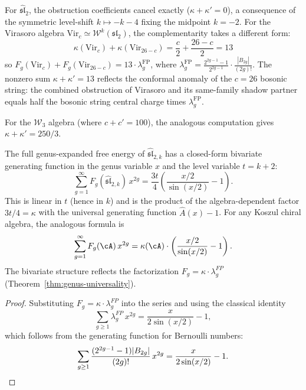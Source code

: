 \begin{remark}\label{rem:sl2-vs-vir-complementarity}
For $\widehat{\mathfrak{sl}}_2$, the obstruction coefficients cancel exactly ($\kappa + \kappa' = 0$), a consequence of the symmetric level-shift $k \mapsto -k-4$ fixing the midpoint $k = -2$.  For the Virasoro algebra $\mathrm{Vir}_c \simeq \mathcal{W}^k(\mathfrak{sl}_2)$, the complementarity takes a different form:
\[
\kappa(\mathrm{Vir}_c) + \kappa(\mathrm{Vir}_{26-c}) = \frac{c}{2} + \frac{26-c}{2} = 13
\]
so $F_g(\mathrm{Vir}_c) + F_g(\mathrm{Vir}_{26-c}) = 13 \cdot \lambda_g^{\mathrm{FP}}$, where $\lambda_g^{\mathrm{FP}} = \frac{2^{2g-1}-1}{2^{2g-1}} \cdot \frac{|B_{2g}|}{(2g)!}$.  The nonzero sum $\kappa + \kappa' = 13$ reflects the conformal anomaly of the $c = 26$ bosonic string: the combined obstruction of Virasoro and its same-family shadow partner equals half the bosonic string central charge times $\lambda_g^{\mathrm{FP}}$.

For the $\mathcal{W}_3$ algebra (where $c + c' = 100$), the analogous computation gives $\kappa + \kappa' = 250/3$.
\end{remark}

\begin{proposition}
\label{prop:bivariate-gf}
The full genus-expanded free energy of $\widehat{\mathfrak{sl}}_{2,k}$ has a closed-form bivariate generating function in the genus variable $x$ and the level variable $t = k + 2$:
\begin{equation}\label{eq:bivariate-gf}
\sum_{g=1}^{\infty} F_g(\widehat{\mathfrak{sl}}_{2,k})\, x^{2g} = \frac{3t}{4}\left(\frac{x/2}{\sin(x/2)} - 1\right).
\end{equation}
This is linear in $t$ (hence in $k$) and is the product of the algebra-dependent factor $3t/4 = \kappa$ with the universal generating function $\hat{A}(x) - 1$.  For any Koszul chiral algebra, the analogous formula is
\begin{equation}\label{eq:bivariate-gf-general}
\sum_{g=1}^{\infty} F_g(\cA)\, x^{2g} = \kappa(\cA) \cdot \left(\frac{x/2}{\sin(x/2)} - 1\right).
\end{equation}
The bivariate structure reflects the factorization $F_g = \kappa \cdot \lambda_g^{FP}$ (Theorem~\ref{thm:genus-universality}).
\end{proposition}

\begin{proof}
Substituting $F_g = \kappa \cdot \lambda_g^{FP}$ into the series and using the classical identity
\[
\sum_{g \geq 1} \lambda_g^{FP}\, x^{2g} = \frac{x}{2\sin(x/2)} - 1,
\]
which follows from the generating function for Bernoulli numbers:
\[
\sum_{g \geq 1} \frac{(2^{2g-1}-1)|B_{2g}|}{(2g)!}\, x^{2g} = \frac{x}{2\sin(x/2)} - 1. \qedhere
\]
\end{proof}


